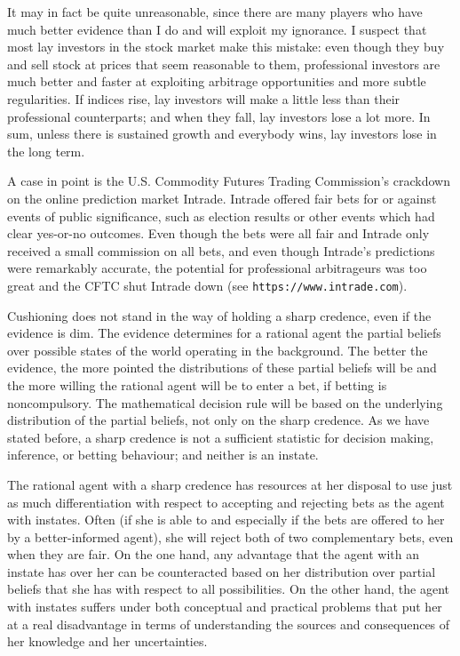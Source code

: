 \documentclass[11pt]{article}
\begin{document}
It may in fact be quite unreasonable, since there are many players who
have much better evidence than I do and will exploit my ignorance. I
suspect that most lay investors in the stock market make this mistake:
even though they buy and sell stock at prices that seem reasonable to
them, professional investors are much better and faster at exploiting
arbitrage opportunities and more subtle regularities. If indices rise,
lay investors will make a little less than their professional
counterparts; and when they fall, lay investors lose a lot more. In
sum, unless there is sustained growth and everybody wins, lay
investors lose in the long term.

A case in point is the U.S. Commodity Futures Trading Commission's
crackdown on the online prediction market Intrade. Intrade offered
fair bets for or against events of public significance, such as
election results or other events which had clear yes-or-no outcomes.
Even though the bets were all fair and Intrade only received a small
commission on all bets, and even though Intrade's predictions were
remarkably accurate, the potential for professional arbitrageurs was
too great and the CFTC shut Intrade down (see
\texttt{https://www.intrade.com}).

Cushioning does not stand in the way of holding a sharp credence, even
if the evidence is dim. The evidence determines for a rational agent
the partial beliefs over possible states of the world operating in the
background. The better the evidence, the more pointed the
distributions of these partial beliefs will be and the more willing
the rational agent will be to enter a bet, if betting is
noncompulsory. The mathematical decision rule will be based on the
underlying distribution of the partial beliefs, not only on the sharp
credence. As we have stated before, a sharp credence is not a
sufficient statistic for decision making, inference, or betting
behaviour; and neither is an instate.

The rational agent with a sharp credence has resources at her disposal
to use just as much differentiation with respect to accepting and
rejecting bets as the agent with instates. Often (if she is able to
and especially if the bets are offered to her by a better-informed
agent), she will reject both of two complementary bets, even when they
are fair. On the one hand, any advantage that the agent with an
instate has over her can be counteracted based on her distribution
over partial beliefs that she has with respect to all possibilities.
On the other hand, the agent with instates suffers under both
conceptual and practical problems that put her at a real disadvantage
in terms of understanding the sources and consequences of her
knowledge and her uncertainties.

 

\end{document}
